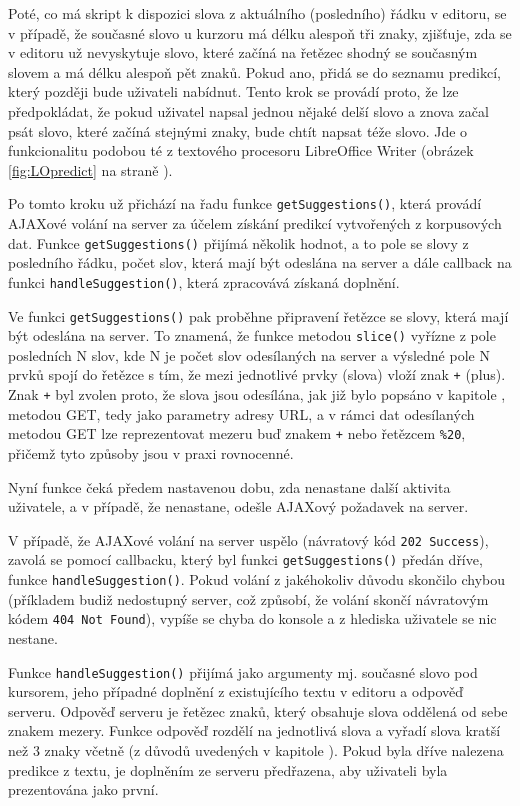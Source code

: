 \documentclass[a4paper,11pt]{article}
\newcommand{\td}[2][]{
	{\todo[size=\footnotesize]{#2}}
}
\begin{document}
Poté, co má skript k dispozici slova z aktuálního (posledního) řádku v editoru, se v případě, že současné slovo u kurzoru má délku alespoň tři znaky, zjišťuje, zda se v editoru už nevyskytuje slovo, které začíná na řetězec shodný se současným slovem a má délku alespoň pět znaků. Pokud ano, přidá se do seznamu predikcí, který později bude uživateli nabídnut. Tento krok se provádí proto, že lze předpokládat, že pokud uživatel napsal jednou nějaké delší slovo a znova začal psát slovo, které začíná stejnými znaky, bude chtít napsat téže slovo. Jde o funkcionalitu podobou té z textového procesoru LibreOffice Writer (obrázek \ref{fig:LOpredict} na straně \pageref{fig:LOpredict}).

Po tomto kroku už přichází na řadu funkce {\tt getSuggestions()}, která provádí AJAXové volání na server za účelem získání predikcí vytvořených z korpusových dat. Funkce {\tt getSuggestions()} přijímá několik hodnot, a to pole se slovy z posledního řádku, počet slov, která mají být odeslána na server a dále callback na funkci {\tt handleSuggestion()}, která zpracovává získaná doplnění.

Ve funkci {\tt getSuggestions()} pak proběhne připravení řetězce se slovy, která mají být odeslána na server. To znamená, že funkce metodou {\tt slice()} vyřízne z pole posledních N slov, kde N je počet slov odesílaných na server a výsledné pole N prvků spojí do řetězce s tím, že mezi jednotlivé prvky (slova) vloží znak {\tt +} (plus). Znak {\tt +} byl zvolen proto, že slova jsou odesílána, jak již bylo popsáno v kapitole , metodou GET, tedy jako parametry adresy URL, a v rámci dat odesílaných metodou GET lze reprezentovat mezeru buď znakem {\tt +} nebo řetězcem {\tt \%20}, přičemž tyto způsoby jsou v praxi \td{are they?}rovnocenné.

Nyní funkce čeká předem nastavenou dobu, zda nenastane další aktivita uživatele, a v případě, že nenastane, odešle AJAXový požadavek na server.

V případě, že AJAXové volání na server uspělo (návratový kód {\tt 202 Success}), zavolá se pomocí callbacku, který byl funkci {\tt getSuggestions()} předán dříve, funkce {\tt handleSuggestion()}. Pokud volání z jakéhokoliv důvodu skončilo chybou (příkladem budiž nedostupný server, což způsobí, že volání skončí návratovým kódem {\tt 404 Not Found}), vypíše se chyba do konsole a z hlediska uživatele se nic nestane. 

Funkce {\tt handleSuggestion()} přijímá jako argumenty mj. současné slovo pod kursorem, jeho případné doplnění z existujícího textu v editoru a odpověď serveru. Odpověď serveru je řetězec znaků, který obsahuje slova oddělená od sebe znakem mezery. Funkce odpověď rozdělí na jednotlivá slova a vyřadí slova kratší než 3 znaky včetně (z důvodů uvedených v kapitole ). Pokud byla dříve nalezena predikce z textu, je doplněním ze serveru předřazena, aby uživateli byla prezentována jako první.
\end{document}
